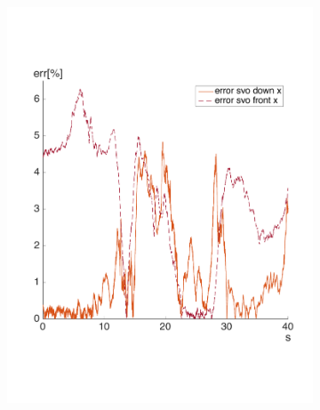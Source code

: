 \begin{figure}[!htbp]
  \centering
  \begin{subfigure}[b]{0.3\textwidth}
        \includegraphics[width=\textwidth]{img/err_perc_2_svo_x.pdf}
        \label{fig:perc_errorone}
   \end{subfigure} \hfill
   \begin{subfigure}[b]{0.3\textwidth}

\end{subfigure}
\end{figure}
